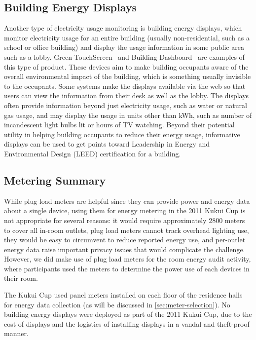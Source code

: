 \subsection{Building Energy Displays}
\label{sec:building-energy-displays}

Another type of electricity usage monitoring is building energy displays, which monitor electricity usage for an entire building (usually non-residential, such as a school or office building) and display the usage information in some public area such as a lobby. Green TouchScreen~\cite{greentouchscreen} and Building Dashboard~\cite{building-dashboard} are examples of this type of product. These devices aim to make building occupants aware of the overall environmental impact of the building, which is something usually invisible to the occupants. Some systems make the displays available via the web so that users can view the information from their desk as well as the lobby. The displays often provide  information beyond just electricity usage, such as water or natural gas usage, and may display the usage in units other than kWh, such as number of incandescent light bulbs lit or hours of TV watching. Beyond their potential utility in helping building occupants to reduce their energy usage, informative displays can be used to get points toward Leadership in Energy and Environmental Design (LEED) certification for a building.


\subsection{Metering Summary}

While plug load meters are helpful since they can provide power and energy data about a single device, using them for energy metering in the 2011 Kukui Cup is not appropriate for several reasons: it would require approximately 2800 meters to cover all in-room outlets, plug load meters cannot track overhead lighting use, they would be easy to circumvent to reduce reported energy use, and per-outlet energy data raise important privacy issues that would complicate the challenge. However, we did make use of plug load meters for the room energy audit activity, where participants used the meters to determine the power use of each devices in their room.

The Kukui Cup used panel meters installed on each floor of the residence halls for energy data collection (as will be discussed in \autoref{sec:meter-selection}). No building energy displays were deployed as part of the 2011 Kukui Cup, due to the cost of displays and the logistics of installing displays in a vandal and theft-proof manner.


